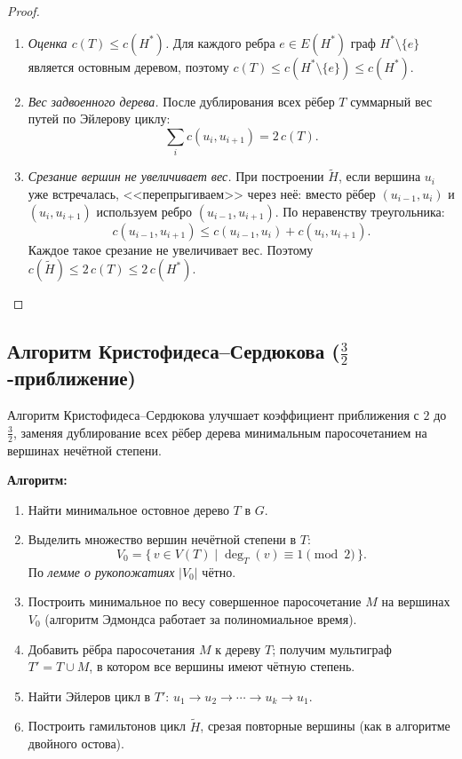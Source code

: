 \begin{proof}
	\begin{enumerate}
		\item \emph{Оценка $c(T) \leq c(H^*)$.} Для каждого ребра $e \in E(H^*)$ граф $H^* \setminus \{e\}$ является остовным деревом, поэтому $c(T) \leq c(H^* \setminus \{e\}) \leq c(H^*)$.
		
		\item \emph{Вес задвоенного дерева.} После дублирования всех рёбер $T$ суммарный вес путей по Эйлерову циклу:
		\[
		\sum_{i} c(u_i, u_{i+1}) = 2\,c(T).
		\]
		
		\item \emph{Срезание вершин не увеличивает вес.} При построении $\widetilde{H}$, если вершина $u_i$ уже встречалась, <<перепрыгиваем>> через неё: вместо рёбер $(u_{i-1},u_i)$ и $(u_i,u_{i+1})$ используем ребро $(u_{i-1},u_{i+1})$. По неравенству треугольника:
		\[
		c(u_{i-1}, u_{i+1}) \leq c(u_{i-1},u_i) + c(u_i, u_{i+1}).
		\]
		Каждое такое срезание не увеличивает вес. Поэтому $c(\widetilde{H}) \leq 2\,c(T) \leq 2\,c(H^*)$.
	\end{enumerate}
\end{proof}

\subsection{Алгоритм Кристофидеса--Сердюкова (\texorpdfstring{$\tfrac{3}{2}$}{3/2}-приближение)}

Алгоритм Кристофидеса--Сердюкова улучшает коэффициент приближения с $2$ до $\tfrac{3}{2}$, заменяя дублирование всех рёбер дерева минимальным паросочетанием на вершинах нечётной степени.

\textbf{Алгоритм:}
\begin{enumerate}
	\item Найти минимальное остовное дерево $T$ в $G$.
	\item Выделить множество вершин нечётной степени в $T$:
	\[
	V_0 = \{\, v \in V(T) \mid \deg_T(v) \equiv 1 \pmod{2} \,\}.
	\]
	По \emph{лемме о рукопожатиях} $|V_0|$ чётно.
	\item Построить минимальное по весу совершенное паросочетание $M$ на вершинах $V_0$ (алгоритм Эдмондса работает за полиномиальное время).
	\item Добавить рёбра паросочетания $M$ к дереву $T$; получим мультиграф $T' = T \cup M$, в котором все вершины имеют чётную степень.
	\item Найти Эйлеров цикл в $T'$: $u_1 \to u_2 \to \cdots \to u_k \to u_1$.
	\item Построить гамильтонов цикл $\widetilde{H}$, срезая повторные вершины (как в алгоритме двойного остова).
\end{enumerate}

